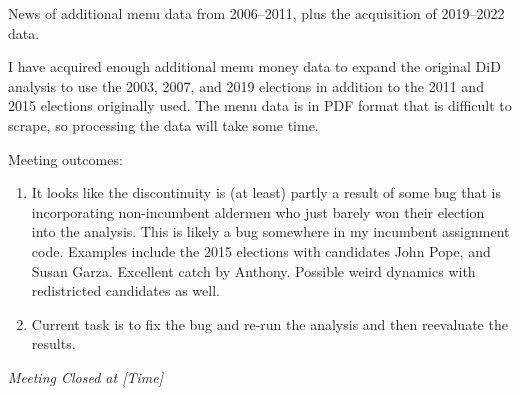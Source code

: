 \documentclass[10pt,a4paper,twoside]{mins}
\begin{document}
\begin{minutes}
\begin{business}
\begin{enumerate}
\end{enumerate}


\item News of additional menu data from 2006--2011, plus the acquisition of 2019--2022 data.

I have acquired enough additional menu money data to expand the original DiD analysis to use the 2003, 2007, and 2019 elections in addition to the 2011 and 2015 elections originally used.  
The menu data is in PDF format that is difficult to scrape, so processing the data will take some time.

\item Meeting outcomes:
\begin{enumerate}
    \item It looks like the discontinuity is (at least) partly a result of some bug that is incorporating non-incumbent aldermen who just barely won their election into the analysis. This is likely a bug somewhere in my incumbent assignment code. Examples include the 2015 elections with candidates John Pope, and Susan Garza. Excellent catch by Anthony. Possible weird dynamics with redistricted candidates as well.
    \item Current task is to fix the bug and re-run the analysis and then reevaluate the results.
\end{enumerate}
\end{business}
\begin{center}\emph{Meeting Closed at [Time]}\end{center}
\end{minutes}
\end{document}
